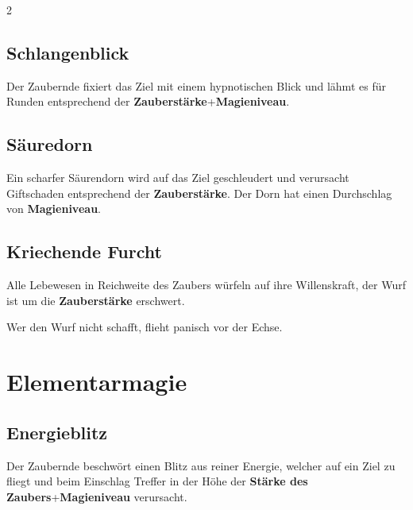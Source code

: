 \begin{multicols*}{2}
\subsection{Schlangenblick}

Der Zaubernde fixiert das Ziel mit einem hypnotischen Blick und lähmt es für Runden entsprechend der \textbf{Zauberstärke}+\textbf{Magieniveau}.



\subsection{Säuredorn}

Ein scharfer Säurendorn wird auf das Ziel geschleudert und verursacht Giftschaden entsprechend der \textbf{Zauberstärke}. Der Dorn hat einen Durchschlag von \textbf{Magieniveau}.



\subsection{Kriechende Furcht}

Alle Lebewesen in Reichweite des Zaubers würfeln auf ihre Willenskraft, der Wurf ist um die \textbf{Zauberstärke} erschwert.

Wer den Wurf nicht schafft, flieht panisch vor der Echse.



\section{Elementarmagie}

\subsection{Energieblitz}

Der Zaubernde beschwört einen Blitz aus reiner Energie, welcher auf ein Ziel zu fliegt und beim Einschlag Treffer in der Höhe der \textbf{Stärke des Zaubers}+\textbf{Magieniveau} verursacht.




\end{multicols*}
